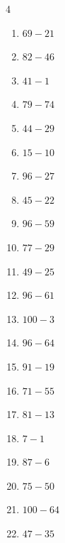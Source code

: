 \begin{multicols}{4}
\begin{enumerate}
  \item $69-21$
        \phantom{$=48$}

  \item $82-46$
        \phantom{$=36$}

  \item $41-1$
        \phantom{$=40$}

  \item $79-74$
        \phantom{$=5$}

  \item $44-29$
        \phantom{$=15$}

  \item $15-10$
        \phantom{$=5$}

  \item $96-27$
        \phantom{$=69$}

  \item $45-22$
        \phantom{$=23$}

\columnbreak %

  \item $96-59$
        \phantom{$=37$}

  \item $77-29$
        \phantom{$=48$}

  \item $49-25$
        \phantom{$=24$}

  \item $96-61$
        \phantom{$=35$}

  \item $100-3$
        \phantom{$=97$}

  \item $96-64$
        \phantom{$=32$}

  \item $91-19$
        \phantom{$=72$}

  \item $71-55$
        \phantom{$=16$}

  \item $81-13$
        \phantom{$=68$}

  \item $7-1$
        \phantom{$=6$}

  \item $87-6$
        \phantom{$=81$}

  \item $75-50$
        \phantom{$=25$}

  \item $100-64$
        \phantom{$=36$}

  \item $47-35$
        \phantom{$=12$}


\end{enumerate}
\end{multicols}
